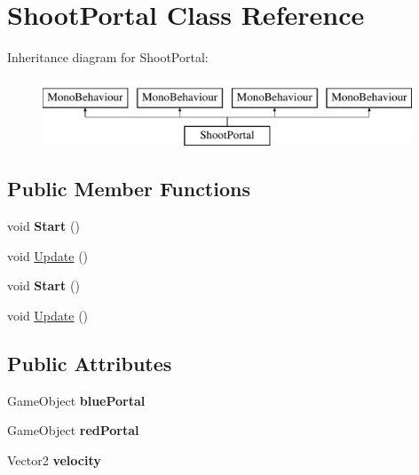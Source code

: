 \hypertarget{class_shoot_portal}{}\section{Shoot\+Portal Class Reference}
\label{class_shoot_portal}
Inheritance diagram for Shoot\+Portal\+:\begin{figure}[H]
\begin{center}
\leavevmode
\includegraphics[height=2.000000cm]{class_shoot_portal}
\end{center}
\end{figure}
\subsection*{Public Member Functions}
\begin{DoxyCompactItemize}
\item 
\mbox{\label{class_shoot_portal_afb543600d8358d399c285b327093a922}} 
void {\bfseries Start} ()
\item 
void \mbox{\hyperlink{class_shoot_portal_a1160266ce719d6b93655286e0909bae8}{Update}} ()
\item 
\mbox{\label{class_shoot_portal_afb543600d8358d399c285b327093a922}} 
void {\bfseries Start} ()
\item 
void \mbox{\hyperlink{class_shoot_portal_a1160266ce719d6b93655286e0909bae8}{Update}} ()
\end{DoxyCompactItemize}
\subsection*{Public Attributes}
\begin{DoxyCompactItemize}
\item 
\mbox{\label{class_shoot_portal_a95eff3530db9dec2b35490910fd61b86}} 
Game\+Object {\bfseries blue\+Portal}
\item 
\mbox{\label{class_shoot_portal_a517208318f35d16c931fc88fb716aab7}} 
Game\+Object {\bfseries red\+Portal}
\item 
\mbox{\label{class_shoot_portal_ad8401d135c3e20f6ca971978621543fd}} 
Vector2 {\bfseries velocity}
\end{DoxyCompactItemize}


